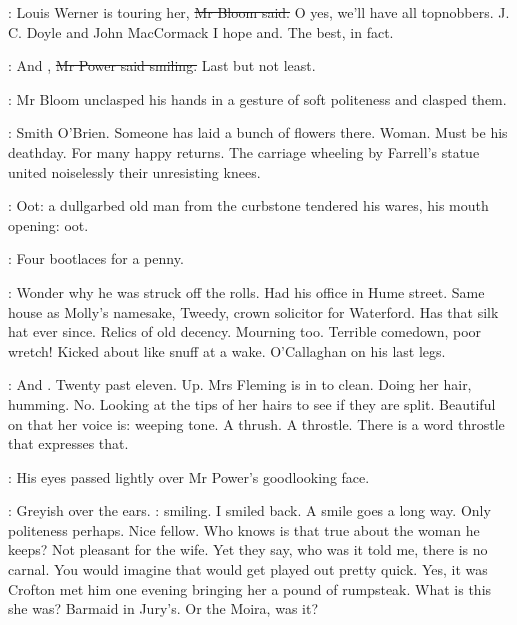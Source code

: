 \Bloom:
Louis Werner is touring her,
\sout{Mr Bloom said.}
O yes, we'll have all topnobbers.
J. C. Doyle and John MacCormack I hope and.
The best, in fact.

\power:
And ,
\sout{Mr Power said smiling.}
Last but not least.

:
Mr Bloom unclasped his hands in a gesture of soft politeness and clasped them.

\BloomInt:
Smith O'Brien.
Someone has laid a bunch of flowers there.
Woman.
Must be his deathday.
For many happy returns.
The carriage wheeling by Farrell's statue
united noiselessly their unresisting knees.

:
Oot:
a dullgarbed old man from the curbstone tendered his wares,
his mouth opening:
oot.

\man:
Four bootlaces for a penny.

\BloomInt:
Wonder why he was struck off the rolls.
Had his office in Hume street.
Same house as Molly's namesake,
Tweedy, crown solicitor for Waterford.
Has that silk hat ever since.
Relics of old decency.
Mourning too.
Terrible comedown, poor wretch!
Kicked about like snuff at a wake.
O'Callaghan on his last legs.

\BloomInt:
And .
Twenty past eleven.
Up.
Mrs Fleming is in to clean.
Doing her hair, humming.
No.
Looking at the tips of her hairs to see if they are split.
Beautiful on that  her voice is:
weeping tone.
A thrush.
A throstle.
There is a word throstle that expresses that.

:
His eyes passed lightly over Mr Power's goodlooking face.

\BloomInt:
Greyish over the ears.
:
smiling.
I smiled back.
A smile goes a long way.
Only politeness perhaps.
Nice fellow.
Who knows is that true about the woman he keeps?
Not pleasant for the wife.
Yet they say,
who was it told me,
there is no carnal.
You would imagine that would get played out pretty quick.
Yes, it was Crofton met him one evening
bringing her a pound of rumpsteak.
What is this she was?
Barmaid in Jury's.
Or the Moira, was it?
